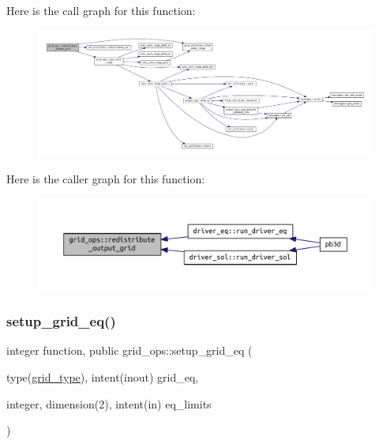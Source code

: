 Here is the call graph for this function\+:\nopagebreak
\begin{figure}[H]
\begin{center}
\leavevmode
\includegraphics[width=350pt]{namespacegrid__ops_ab10ef5b486ee3861df2da4e53bc22630_cgraph}
\end{center}
\end{figure}
Here is the caller graph for this function\+:\nopagebreak
\begin{figure}[H]
\begin{center}
\leavevmode
\includegraphics[width=350pt]{namespacegrid__ops_ab10ef5b486ee3861df2da4e53bc22630_icgraph}
\end{center}
\end{figure}
\mbox{\label{namespacegrid__ops_af63366847d1caa64a7d329672292fd34}} 
\subsubsection{\texorpdfstring{setup\+\_\+grid\+\_\+eq()}{setup\_grid\_eq()}}
{\footnotesize\ttfamily integer function, public grid\+\_\+ops\+::setup\+\_\+grid\+\_\+eq (\begin{DoxyParamCaption}\item[{type(\hyperlink{structgrid__vars_1_1grid__type}{grid\+\_\+type}), intent(inout)}]{grid\+\_\+eq,  }\item[{integer, dimension(2), intent(in)}]{eq\+\_\+limits }\end{DoxyParamCaption})}



